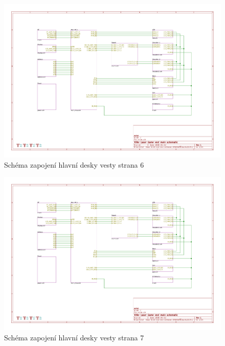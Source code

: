 \begin{landscape}
    \begin{figure}[h]
        \centering
        \includegraphics[page=6, height=\textwidth]{sch/main}
        \caption{Schéma zapojení hlavní desky vesty strana 6}
    \end{figure}
\end{landscape}
\begin{landscape}
    \begin{figure}[h]
        \centering
        \includegraphics[page=7, height=\textwidth]{sch/main}
        \caption{Schéma zapojení hlavní desky vesty strana 7}
    \end{figure}
\end{landscape}
